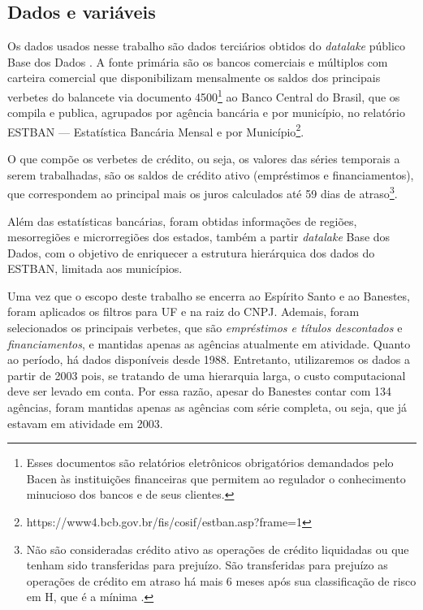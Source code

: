 \documentclass[
  12pt,
  twoside,
  openright,
  a4paper,
  chapter=TITLE,
  section=TITLE,
  brazil]{abntex2}
\begin{document}
\subsection{Dados e variáveis}\label{dados-e-variuxe1veis}

Os dados usados nesse trabalho são dados terciários obtidos do
\emph{datalake} público Base dos Dados \autocite{dahis_data_2022}. A
fonte primária são os bancos comerciais e múltiplos com carteira
comercial que disponibilizam mensalmente os saldos dos principais
verbetes do balancete via documento 4500\footnote{Esses documentos são
  relatórios eletrônicos obrigatórios demandados pelo Bacen às
  instituições financeiras que permitem ao regulador o conhecimento
  minucioso dos bancos e de seus clientes.} ao Banco Central do Brasil,
que os compila e publica, agrupados por agência bancária e por
município, no relatório ESTBAN --- Estatística Bancária Mensal e por
Município\footnote{https://www4.bcb.gov.br/fis/cosif/estban.asp?frame=1}.

O que compõe os verbetes de crédito, ou seja, os valores das séries
temporais a serem trabalhadas, são os saldos de crédito ativo
(empréstimos e financiamentos), que correspondem ao principal mais os
juros calculados até 59 dias de atraso\footnote{Não são consideradas
  crédito ativo as operações de crédito liquidadas ou que tenham sido
  transferidas para prejuízo. São transferidas para prejuízo as
  operações de crédito em atraso há mais 6 meses após sua classificação
  de risco em H, que é a mínima
  \autocite{conselho_monetario_nacional_resolucao_1999}.}.

Além das estatísticas bancárias, foram obtidas informações de regiões,
mesorregiões e microrregiões dos estados, também a partir
\emph{datalake} Base dos Dados, com o objetivo de enriquecer a estrutura
hierárquica dos dados do ESTBAN, limitada aos municípios.

Uma vez que o escopo deste trabalho se encerra ao Espírito Santo e ao
Banestes, foram aplicados os filtros para UF e na raiz do CNPJ. Ademais,
foram selecionados os principais verbetes, que são \emph{empréstimos e
títulos descontados} e \emph{financiamentos}, e mantidas apenas as
agências atualmente em atividade. Quanto ao período, há dados
disponíveis desde 1988. Entretanto, utilizaremos os dados a partir de
2003 pois, se tratando de uma hierarquia larga, o custo computacional
deve ser levado em conta. Por essa razão, apesar do Banestes contar com
134 agências, foram mantidas apenas as agências com série completa, ou
seja, que já estavam em atividade em 2003.
\end{document}

